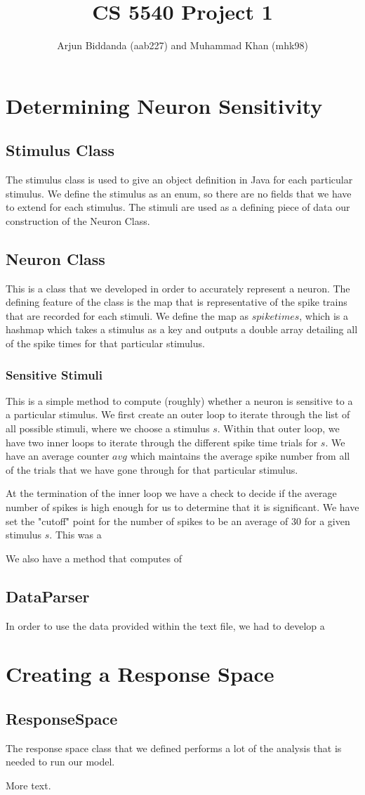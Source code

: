 \documentclass[11pt]{article} %
\title{CS 5540 Project 1}
\author{Arjun Biddanda (aab227) and Muhammad Khan (mhk98)}
\begin{document}
\maketitle

\section{Determining Neuron Sensitivity}
\subsection{Stimulus Class}
The stimulus class is used to give an object definition in Java for each particular stimulus. We define the stimulus as an enum, so there are no fields that we have to extend for each stimulus. The stimuli are used as a defining piece of data our construction of the Neuron Class.

\subsection{Neuron Class}
This is a class that we developed in order to accurately represent a neuron. The defining feature of the class is the map that is representative of the spike trains that are recorded for each stimuli. We define the map as $spiketimes$, which is a hashmap which takes a stimulus as a key and outputs a double array detailing all of the spike times for that particular stimulus. 
\subsubsection{Sensitive Stimuli}
This is a simple method to compute (roughly) whether a neuron is sensitive to a a particular stimulus. We first create an outer loop to iterate through the list of all possible stimuli, where we choose a stimulus $s$. Within that outer loop, we have two inner loops to iterate through the different spike time trials for $s$. We have an average counter $avg$ which maintains the average spike number from all of the trials that we have gone through for that particular stimulus. 

At the termination of the inner loop we have a check to decide if the average number of spikes is high enough for us to determine that it is significant. We have set the "cutoff" point for the number of spikes to be an average of 30 for a given stimulus $s$. This was a 

We also have a method that computes of 



\subsection{DataParser}
In order to use the data provided within the text file, we had to develop a  





\section{Creating a Response Space}
\subsection{ResponseSpace}
The response space class that we defined performs a lot of the analysis that is needed to run our model. 


More text.
\end{document}
